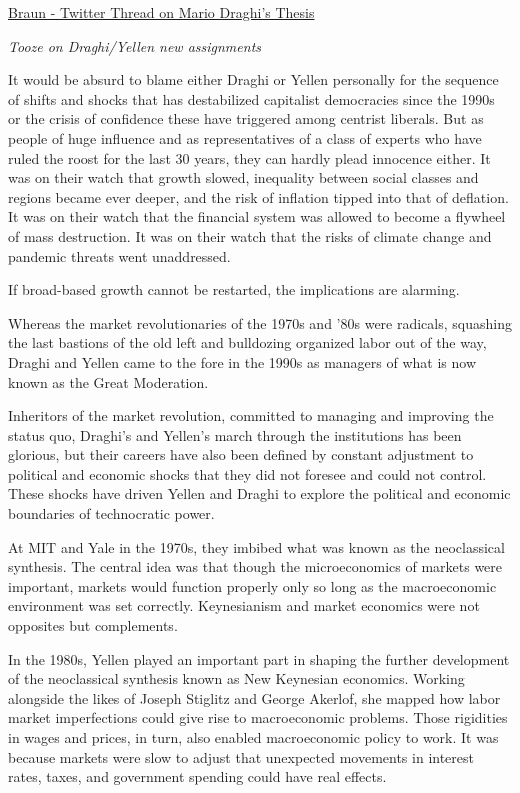 \documentclass[
]{book}
\begin{document}
\href{https://twitter.com/BJMbraun/status/1387737805405802498}{Braun - Twitter Thread on Mario Draghi's Thesis}

\emph{Tooze on Draghi/Yellen new assignments}

It would be absurd to blame either Draghi or Yellen personally for the sequence of shifts and shocks that has destabilized capitalist democracies since the 1990s or the crisis of confidence these have triggered among centrist liberals. But as people of huge influence and as representatives of a class of experts who have ruled the roost for the last 30 years, they can hardly plead innocence either. It was on their watch that growth slowed, inequality between social classes and regions became ever deeper, and the risk of inflation tipped into that of deflation. It was on their watch that the financial system was allowed to become a flywheel of mass destruction. It was on their watch that the risks of climate change and pandemic threats went unaddressed.

If broad-based growth cannot be restarted, the implications are alarming.

Whereas the market revolutionaries of the 1970s and '80s were radicals, squashing the last bastions of the old left and bulldozing organized labor out of the way, Draghi and Yellen came to the fore in the 1990s as managers of what is now known as the Great Moderation.

Inheritors of the market revolution, committed to managing and improving the status quo, Draghi's and Yellen's march through the institutions has been glorious, but their careers have also been defined by constant adjustment to political and economic shocks that they did not foresee and could not control. These shocks have driven Yellen and Draghi to explore the political and economic boundaries of technocratic power.

At MIT and Yale in the 1970s, they imbibed what was known as the neoclassical synthesis. The central idea was that though the microeconomics of markets were important, markets would function properly only so long as the macroeconomic environment was set correctly. Keynesianism and market economics were not opposites but complements.

In the 1980s, Yellen played an important part in shaping the further development of the neoclassical synthesis known as New Keynesian economics. Working alongside the likes of Joseph Stiglitz and George Akerlof, she mapped how labor market imperfections could give rise to macroeconomic problems.
Those rigidities in wages and prices, in turn, also enabled macroeconomic policy to work. It was because markets were slow to adjust that unexpected movements in interest rates, taxes, and government spending could have real effects.
\end{document}
